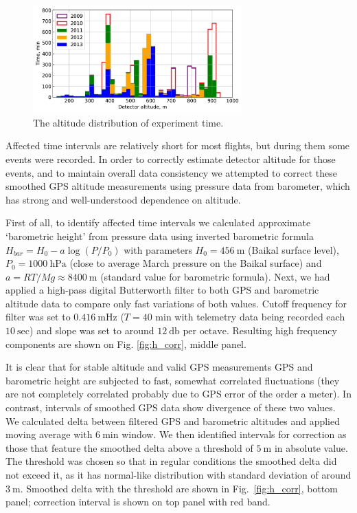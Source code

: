 \documentclass[final,5p,times,twocolumn]{elsarticle}
\begin{document}
\begin{figure}[t]
    \includegraphics[width=19pc]{time_on_altitude.pdf}%
    \caption{The altitude distribution of experiment time.}
    \label{fig:time_on_altitude}
\end{figure}

Affected time intervals are relatively short for most flights, but during them some events were recorded. In order to correctly estimate detector altitude for those events, and to maintain overall data consistency we attempted to correct these smoothed GPS altitude measurements using pressure data from barometer, which has strong and well-understood dependence on altitude.

First of all, to identify affected time intervals we calculated approximate `barometric height' from pressure data using inverted barometric formula $H_{bar} = H_0 - a \log (P/P_0)$ with parameters $H_0 = 456~\textrm{m}$ (Baikal surface level), $P_0 = 1000~\textrm{hPa}$ (close to average March pressure on the Baikal surface) and $a = {RT}/{Mg} \approx 8400~\textrm{m}$ (standard value for barometric formula). Next, we had applied a high-pass digital Butterworth filter to both GPS and barometric altitude data to compare only fast variations of both values. Cutoff frequency for filter was set to $0.416~\textrm{mHz}$ ($T=40$ min with telemetry data being recorded each $10~\textrm{sec}$) and slope was set to around $12~\textrm{db per octave}$. Resulting high frequency components are shown on Fig. \ref{fig:h_corr}, middle panel.

It is clear that for stable altitude and valid GPS measurements GPS and barometric height are subjected to fast, somewhat correlated fluctuations (they are not completely correlated probably due to GPS error of the order a meter). In contrast, intervals of smoothed GPS data show divergence of these two values. We calculated delta between filtered GPS and barometric altitudes and applied moving average with $6~\textrm{min}$ window. We then identified intervals for correction as those that feature the smoothed delta above a threshold of $5~\textrm{m}$ in absolute value. The threshold was chosen so that in regular conditions the smoothed delta did not exceed it, as it has normal-like distribution with standard deviation of around $3~\textrm{m}$. Smoothed delta with the threshold are shown in Fig.~\ref{fig:h_corr}, bottom panel; correction interval is shown on top panel with red band.
\end{document}
